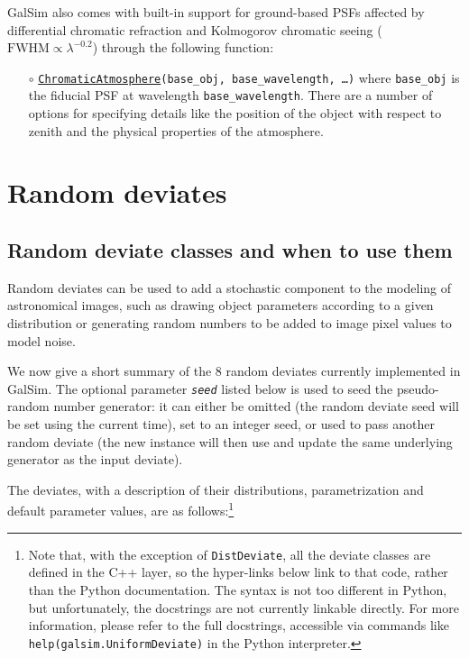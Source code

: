\documentclass[preprint,10pt]{../../devel/modules/aastex}
\begin{document}
GalSim also comes with built-in support for ground-based PSFs affected by differential chromatic
refraction and Kolmogorov chromatic seeing ($\mathrm{FWHM} \propto \lambda^{-0.2}$) through the
following function:
\begin{itemize}
  \item[$\circ$] 
  \texttt{\href{http://galsim-developers.github.io/GalSim/namespacegalsim_1_1chromatic.html\#a90f867f2cde815b9048117e9e426e968}{ChromaticAtmosphere}(base\_obj, base\_wavelength, \dots)}
    \newline
    where \texttt{base\_obj} is the fiducial PSF at wavelength \texttt{base\_wavelength}.
    There are a number of options for specifying details like the position of the object with
    respect to zenith and the physical properties of the atmosphere.
\end{itemize}

\section{Random deviates}\label{sect:random}
\subsection{Random deviate classes and when to use them}
Random deviates can be used to add a stochastic
component to the modeling of astronomical images, such as drawing
object parameters according to a given distribution or generating random
numbers to be added to image pixel values to model noise.

We now give a short summary of the 8 random deviates currently
implemented in GalSim.   The optional parameter \emph{\texttt{seed}}
listed below is used
to seed the pseudo-random number generator: it can
either be omitted (the random deviate seed will be set using the
current time), set to an integer seed, or used to pass another random
deviate (the new instance will then use and update the same underlying
generator as the input deviate).

The deviates, with a description of their distributions, parametrization and
default parameter values, are as follows:\footnote{
Note that, with the exception of \texttt{DistDeviate},
all the deviate classes are defined in the C++ layer, so the hyper-links
below link to that code, rather than the Python documentation.  The
syntax is not too different in Python, but unfortunately, the docstrings
are not currently linkable directly.  
For more information, please refer to the full docstrings, accessible
via commands like \texttt{help(galsim.UniformDeviate)} in the Python interpreter.}
\end{document}
